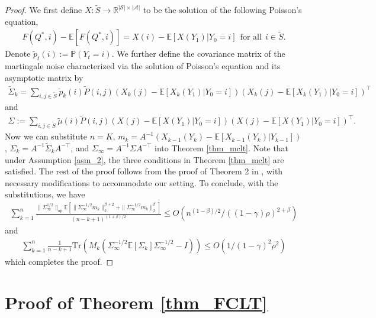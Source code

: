 \documentclass{opt2025} %
\begin{document}
\begin{proof}
We first define $X: \tilde{S}\rightarrow \mathbb{R}^{|\mathcal{S}|\times|\mathcal{A}|}$ to be the solution of the following Poisson's equation,
\begin{align*}
F(Q^*, i) - \mathbb{E}[F(Q^*, i)] = X(i) - \mathbb{E}[X(Y_1)| Y_0=i] \ \ \text{for all}\ \ i\in \tilde{S}.
\end{align*}
Denote $\tilde{p}_t(i) := \mathbb{P}(Y_t=i)$. We further define the covariance matrix of the martingale noise characterized via the solution of Poisson’s equation and its asymptotic matrix by
\begin{align*}
\tilde{\Sigma}_{k} = \sum_{i,j\in \tilde{S}} \tilde{p}_k(i)  \tilde{P}(i,j) (X_k(j) - \mathbb{E}[X_k(Y_1)|Y_0=i])(X_k(j) - \mathbb{E}[X_k(Y_1)|Y_0=i])^{\top}
\end{align*}
and
\begin{align*}
\Sigma := \sum_{i,j\in \tilde{S}} \tilde{\mu}(i)  \tilde{P}(i,j) (X(j) - \mathbb{E}[X(Y_1)|Y_0=i])(X(j) - \mathbb{E}[X(Y_1)|Y_0=i])^{\top}.
\end{align*}
Now we can substitute $n = K$, $m_k = A^{-1}( X_{k-1}(Y_{k}) - \mathbb{E}[X_{k-1}(Y_{k})| Y_{k-1}])$, $\Sigma_{k} = A^{-1}\tilde{\Sigma}_{k}A^{-\top}$, and $\Sigma_{\infty}=A^{-1}\Sigma A^{-\top}$ into Theorem \ref{thm_mclt}. Note that under Assumption \ref{asm_2}, the three conditions in Theorem \ref{thm_mclt} are satisfied. The rest of the proof follows from the proof of Theorem 2 in \citet{srikant2024rates}, with necessary modifications to accommodate our setting. To conclude, with the substitutions, we have
\begin{align*}
\sum_{k=1}^n \frac{\|\Sigma_{\infty}^{1/2}\|_{\mathrm{op}}\mathbb{E}[\|\Sigma_{\infty}^{-1/2} m_k \|_2^{\beta+2} + \| \Sigma_{\infty}^{-1/2} m_k \|_2^{\beta}]}{(n-k+1)^{(1+\beta)/2}} \leq O\left(  n^{(1-\beta)/2} /((1-\gamma)\rho)^{2+\beta}\right)
\end{align*}
and
\begin{align*}
\sum_{k=1}^n\frac{1}{n-k+1} \mathrm{Tr}(M_k(\Sigma_{\infty}^{-1/2}\mathbb{E}[\Sigma_k]\Sigma_{\infty}^{-1/2}-I)) \leq O\left( 1/(1-\gamma)^2\rho^2 \right)
\end{align*}
which completes the proof.


\end{proof}









\section{Proof of Theorem \ref{thm_FCLT}}
\end{document}
